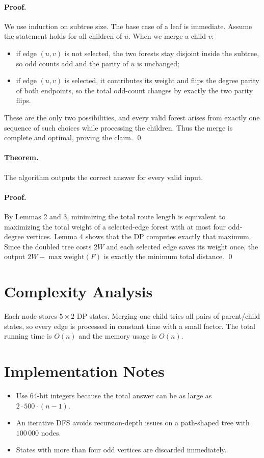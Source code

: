 \documentclass[11pt]{article}
\begin{document}
\paragraph{Proof.}
We use induction on subtree size. The base case of a leaf is immediate.
Assume the statement holds for all children of $u$. When we merge a child $v$:
\begin{itemize}[leftmargin=*]
    \item if edge $(u,v)$ is not selected, the two forests stay disjoint inside the subtree, so odd counts add
    and the parity of $u$ is unchanged;
    \item if edge $(u,v)$ is selected, it contributes its weight and flips the degree parity of both endpoints,
    so the total odd-count changes by exactly the two parity flips.
\end{itemize}
These are the only two possibilities, and every valid forest arises from exactly one sequence of such
choices while processing the children. Thus the merge is complete and optimal, proving the claim. \qed

\paragraph{Theorem.}
The algorithm outputs the correct answer for every valid input.

\paragraph{Proof.}
By Lemmas 2 and 3, minimizing the total route length is equivalent to maximizing the total weight of a
selected-edge forest with at most four odd-degree vertices. Lemma 4 shows that the DP computes exactly
that maximum. Since the doubled tree costs $2W$ and each selected edge saves its weight once, the output
$2W - \max \text{weight}(F)$ is exactly the minimum total distance. \qed

\section*{Complexity Analysis}

Each node stores $5 \times 2$ DP states. Merging one child tries all pairs of parent/child states, so every
edge is processed in constant time with a small factor. The total running time is $O(n)$ and the memory
usage is $O(n)$.

\section*{Implementation Notes}

\begin{itemize}[leftmargin=*]
    \item Use 64-bit integers because the total answer can be as large as $2 \cdot 500 \cdot (n-1)$.
    \item An iterative DFS avoids recursion-depth issues on a path-shaped tree with $100\,000$ nodes.
    \item States with more than four odd vertices are discarded immediately.
\end{itemize}
\end{document}
